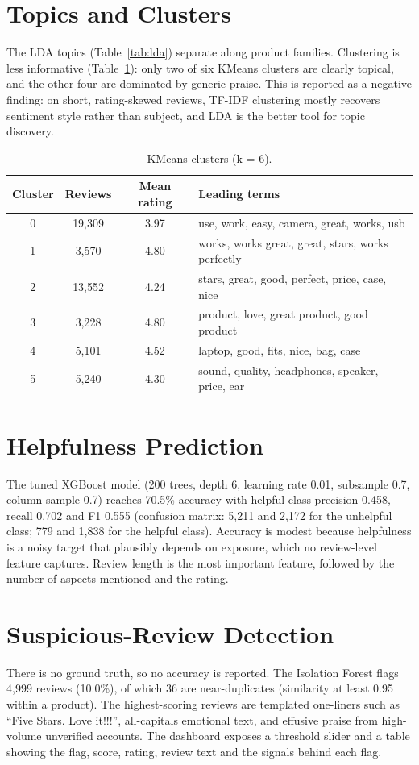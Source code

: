 \documentclass[12pt,a4paper]{report}
\begin{document}
\section{Topics and Clusters}
The LDA topics (Table~\ref{tab:lda}) separate along product families. Clustering is less informative (Table~\ref{tab:km}): only two of six KMeans clusters are clearly topical, and the other four are dominated by generic praise. This is reported as a negative finding: on short, rating-skewed reviews, TF-IDF clustering mostly recovers sentiment style rather than subject, and LDA is the better tool for topic discovery.
\begin{table}[htbp]
\centering
\caption{KMeans clusters (k = 6).}\label{tab:km}
\small
\begin{tabularx}{\textwidth}{@{}cccX@{}}
\toprule
Cluster & Reviews & Mean rating & Leading terms \\
\midrule
0 & 19,309 & 3.97 & use, work, easy, camera, great, works, usb \\
1 & 3,570 & 4.80 & works, works great, great, stars, works perfectly \\
2 & 13,552 & 4.24 & stars, great, good, perfect, price, case, nice \\
3 & 3,228 & 4.80 & product, love, great product, good product \\
4 & 5,101 & 4.52 & laptop, good, fits, nice, bag, case \\
5 & 5,240 & 4.30 & sound, quality, headphones, speaker, price, ear \\
\bottomrule
\end{tabularx}
\end{table}

\section{Helpfulness Prediction}
The tuned XGBoost model (200 trees, depth 6, learning rate 0.01, subsample 0.7, column sample 0.7) reaches 70.5\% accuracy with helpful-class precision 0.458, recall 0.702 and F1 0.555 (confusion matrix: 5,211 and 2,172 for the unhelpful class; 779 and 1,838 for the helpful class). Accuracy is modest because helpfulness is a noisy target that plausibly depends on exposure, which no review-level feature captures. Review length is the most important feature, followed by the number of aspects mentioned and the rating.

\section{Suspicious-Review Detection}
There is no ground truth, so no accuracy is reported. The Isolation Forest flags 4,999 reviews (10.0\%), of which 36 are near-duplicates (similarity at least 0.95 within a product). The highest-scoring reviews are templated one-liners such as ``Five Stars. Love it!!!'', all-capitals emotional text, and effusive praise from high-volume unverified accounts. The dashboard exposes a threshold slider and a table showing the flag, score, rating, review text and the signals behind each flag.
\end{document}
